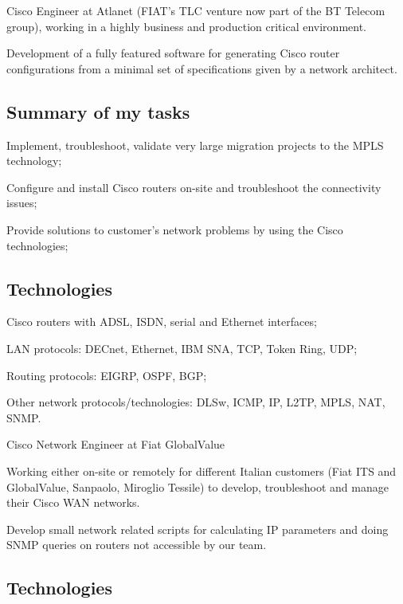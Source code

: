 Cisco Engineer at Atlanet (FIAT's TLC venture now part of the BT Telecom group), 
working in a highly business and production critical environment.

Development of a fully featured software for generating Cisco router
configurations from a minimal set of specifications given by a network architect.

\subsection{Summary of my tasks}

\item{\bdot} Implement, troubleshoot, validate very large migration projects
   to the MPLS technology;
\item{\bdot} Configure and install Cisco routers on-site and troubleshoot the
   connectivity issues;
\item{\bdot} Provide solutions to customer's network problems by using the Cisco
   technologies;

\subsection{Technologies}

\item{\bdot} Cisco routers with ADSL, ISDN, serial and Ethernet interfaces;
\item{\bdot} LAN protocols: DECnet, Ethernet, IBM SNA, TCP, Token Ring, UDP;
\item{\bdot} Routing protocols: EIGRP, OSPF, BGP;
\item{\bdot} Other network protocols/technologies: DLSw, ICMP, IP, L2TP, 
   MPLS, NAT, SNMP.


   {Cisco Network Engineer at Fiat GlobalValue}

Working either on-site or remotely for different Italian customers (Fiat ITS
and GlobalValue, Sanpaolo, Miroglio Tessile) to develop, troubleshoot and
manage their Cisco WAN networks.

Develop small network related scripts for calculating IP parameters and doing
SNMP queries on routers not accessible by our team.

\subsection{Technologies}

